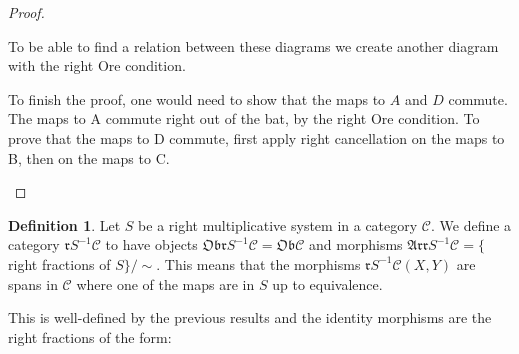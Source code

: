 \documentclass[11pt]{article}
\theoremstyle{definition}
\newtheorem{definition}{Definition}[section]
\theoremstyle{remark}
\begin{document}
\begin{proof}
\begin{center}
\begin{minipage}[c]{0.4\textwidth}
                    \end{minipage}
                \end{center}
                To be able to find a relation between these diagrams we create another diagram with the right Ore condition.
                \begin{center}
                    \begin{minipage}[c]{0.3\textwidth}
                    \end{minipage}
                    \begin{minipage}[c]{0.5\textwidth}
                        To finish the proof, one would need to show that the maps to $A$ and $D$ commute. The maps to A commute right out of the bat, by the right Ore condition. To prove that the maps to D commute, first apply right cancellation on the maps to B, then on the maps to C.
                    \end{minipage}
                \end{center}
            \end{proof}

            \begin{definition}
                Let $S$ be a right multiplicative system in a category $\mathcal{C}$. We define a category $\mathfrak{r}S^{-1}\mathcal{C}$ to have objects $\mathfrak{Obr}S^{-1}\mathcal{C}=\mathfrak{Ob}\mathcal{C}$ and morphisms $\mathfrak{Arr}S^{-1}\mathcal{C} = \{$right fractions of $S\}/\sim$. This means that the morphisms $\mathfrak{r}S^{-1}\mathcal{C}(X,Y)$ are spans in $\mathcal{C}$ where one of the maps are in $S$ up to equivalence.
                \begin{center}
                \end{center}
                This is well-defined by the previous results and the identity morphisms are the right fractions of the form:
                \begin{center}
                \end{center}
            \end{definition}
\end{document}
